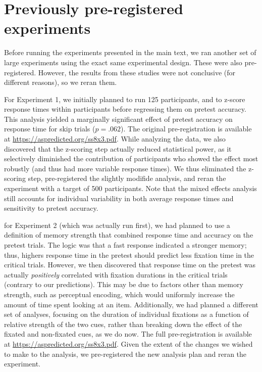 \section{Previously pre-registered experiments}\label{app:previous}

Before running the experiments presented in the main text, we ran another set of large experiments using the exact same experimental design. These were also pre-registered. However, the results from these studies were not conclusive (for different reasons), so we reran them.

For Experiment 1, we initially planned to run 125 participants, and to z-score response times within participants before regressing them on pretest accuracy. This analysis yielded a marginally significant effect of pretest accuracy on response time for skip trials ($p=.062$). The original pre-registration is available at \url{https://aspredicted.org/ss8x3.pdf}. While analyzing the data, we also discovered that the z-scoring step actually reduced statistical power, as it selectively diminished the contribution of participants who showed the effect most robustly (and thus had more variable response times). We thus eliminated the z-scoring step, pre-registered the slightly modifide analysis, and reran the experiment with a target of 500 participants. Note that the mixed effects analysis still accounts for individual variability in both average response times and sensitivity to pretest accuracy.

for Experiment 2 (which was actually run first), we had planned to use a definition of memory strength that combined response time and accuracy on the pretest trials. The logic was that a fast response indicated a stronger memory; thus, highers response time in the pretest should predict less fixation time in the critical trials. However, we then discovered that response time on the pretest was actually \emph{positively} correlated with fixation durations in the critical trials (contrary to our predictions). This may be due to factors other than memory strength, such as perceptual encoding, which would uniformly increase the amount of time spent looking at an item. Additionally, we had planned a different set of analyses, focusing on the duration of individual fixations as a function of relative strength of the two cues, rather than breaking down the effect of the fixated and non-fixated cues, as we do now. The full pre-registration is available at \url{https://aspredicted.org/ss8x3.pdf}.
Given the extent of the changes we wished to make to the analysis, we pre-registered the new analysis plan and reran the experiment.

